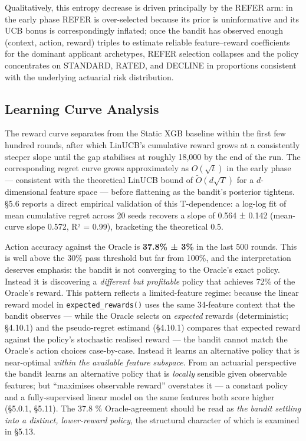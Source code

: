 Qualitatively, this entropy decrease is driven principally by the REFER arm: in the early phase REFER is over-selected because its prior is uninformative and its UCB bonus is correspondingly inflated; once the bandit has observed enough (context, action, reward) triples to estimate reliable feature--reward coefficients for the dominant applicant archetypes, REFER selection collapses and the policy concentrates on STANDARD, RATED, and DECLINE in proportions consistent with the underlying actuarial risk distribution.

\subsection{Learning Curve Analysis}\label{learning-curve-analysis}

The reward curve separates from the Static XGB baseline within the first few hundred rounds, after which LinUCB's cumulative reward grows at a consistently steeper slope until the gap stabilises at roughly 18,000 by the end of the run. The corresponding regret curve grows approximately as \(O(\sqrt{t})\) in the early phase --- consistent with the theoretical LinUCB bound of \(\tilde{O}(d\sqrt{T})\) for a \(d\)-dimensional feature space \citep{Li2010} --- before flattening as the bandit's posterior tightens. §5.6 reports a direct empirical validation of this T-dependence: a log-log fit of mean cumulative regret across 20 seeds recovers a slope of 0.564 ± 0.142 (mean-curve slope 0.572, R² = 0.99), bracketing the theoretical 0.5.

Action accuracy against the Oracle is \textbf{37.8\% ± 3\%} in the last 500 rounds. This is well above the 30\% pass threshold but far from 100\%, and the interpretation deserves emphasis: the bandit is not converging to the Oracle's exact policy. Instead it is discovering a \emph{different but profitable} policy that achieves 72\% of the Oracle's reward. This pattern reflects a limited-feature regime: because the linear reward model in \texttt{expected\_rewards()} uses the same 34-feature context that the bandit observes --- while the Oracle selects on \emph{expected} rewards (deterministic; §4.10.1) and the pseudo-regret estimand (§4.10.1) compares that expected reward against the policy's stochastic realised reward --- the bandit cannot match the Oracle's action choices case-by-case. Instead it learns an alternative policy that is near-optimal \emph{within the available feature subspace}. From an actuarial perspective the bandit learns an alternative policy that is \emph{locally} sensible given observable features; but ``maximises observable reward'' overstates it --- a constant policy and a fully-supervised linear model on the same features both score higher (§5.0.1, §5.11). The 37.8 \% Oracle-agreement should be read as \emph{the bandit settling into a distinct, lower-reward policy}, the structural character of which is examined in §5.13.

